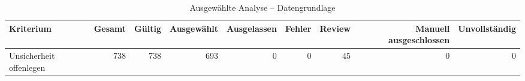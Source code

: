 \begin{table}[htbp]
\centering
\caption{Ausgewählte Analyse -- Datengrundlage}
\begin{tabular}{lrrrrrrrr}
\toprule
Kriterium & Gesamt & Gültig & Ausgewählt & Ausgelassen & Fehler & Review & Manuell ausgeschlossen & Unvollständig \\
\midrule
Unsicherheit offenlegen & 738 & 738 & 693 & 0 & 0 & 45 & 0 & 0 \\
\bottomrule
\end{tabular}
\end{table}
